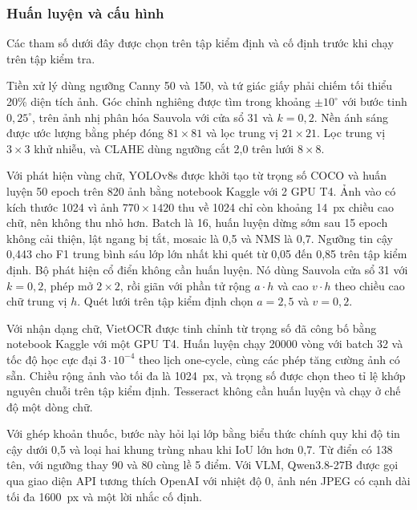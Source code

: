 \subsubsection{Huấn luyện và cấu hình}
Các tham số dưới đây được chọn trên tập kiểm định và cố định trước khi chạy trên tập kiểm tra.

Tiền xử lý dùng ngưỡng Canny 50 và 150, và tứ giác giấy phải chiếm tối thiểu 20\% diện tích ảnh.
Góc chỉnh nghiêng được tìm trong khoảng $\pm10^\circ$ với bước tinh $0{,}25^\circ$, trên ảnh nhị phân hóa Sauvola với cửa sổ 31 và $k=0{,}2$.
Nền ánh sáng được ước lượng bằng phép đóng $81\times81$ và lọc trung vị $21\times21$.
Lọc trung vị $3\times3$ khử nhiễu, và CLAHE dùng ngưỡng cắt 2,0 trên lưới $8\times8$.

Với phát hiện vùng chữ, YOLOv8s được khởi tạo từ trọng số COCO và huấn luyện 50 epoch trên 820 ảnh bằng notebook Kaggle với 2 GPU T4.
Ảnh vào có kích thước 1024 vì ảnh $770\times1420$ thu về 1024 chỉ còn khoảng 14~px chiều cao chữ, nên không thu nhỏ hơn.
Batch là 16, huấn luyện dừng sớm sau 15 epoch không cải thiện, lật ngang bị tắt, mosaic là 0,5 và NMS là 0,7.
Ngưỡng tin cậy 0,443 cho F1 trung bình sáu lớp lớn nhất khi quét từ 0,05 đến 0,85 trên tập kiểm định.
Bộ phát hiện cổ điển không cần huấn luyện.
Nó dùng Sauvola cửa sổ 31 với $k=0{,}2$, phép mở $2\times2$, rồi giãn với phần tử rộng $a\cdot h$ và cao $v\cdot h$ theo chiều cao chữ trung vị $h$.
Quét lưới trên tập kiểm định chọn $a=2{,}5$ và $v=0{,}2$.

Với nhận dạng chữ, VietOCR được tinh chỉnh từ trọng số đã công bố bằng notebook Kaggle với một GPU T4.
Huấn luyện chạy \num{20000} vòng với batch 32 và tốc độ học cực đại $3\cdot10^{-4}$ theo lịch one-cycle, cùng các phép tăng cường ảnh có sẵn.
Chiều rộng ảnh vào tối đa là 1024~px, và trọng số được chọn theo tỉ lệ khớp nguyên chuỗi trên tập kiểm định.
Tesseract không cần huấn luyện và chạy ở chế độ một dòng chữ.

Với ghép khoản thuốc, bước này hỏi lại lớp bằng biểu thức chính quy khi độ tin cậy dưới 0,5 và loại hai khung trùng nhau khi IoU lớn hơn 0,7.
Từ điển có 138 tên, với ngưỡng thay 90 và 80 cùng lề 5 điểm.
Với VLM, Qwen3.8-27B được gọi qua giao diện API tương thích OpenAI với nhiệt độ 0, ảnh nén JPEG có cạnh dài tối đa 1600~px và một lời nhắc cố định.
